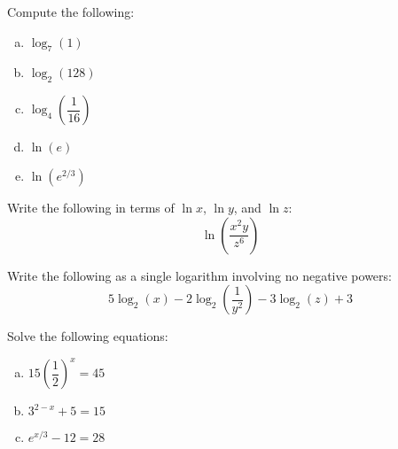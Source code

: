 \documentclass[11pt,letterpaper]{article}
\begin{document}

 Compute the following:
	\begin{enumerate}[(a)]
	\item $\log_7(1)$
	\item $\log_2(128)$
	\item $\log_4 \left( \dfrac{1}{16} \right)$
	\item $\ln(e)$
	\item $\ln(e^{2/3})$
	\end{enumerate}



\newpage



 Write the following in terms of $\ln x$, $\ln y$, and $\ln z$:
	\[
	\ln \left( \dfrac{x^2 y}{z^6} \right)
	\]



\newpage



 Write the following as a single logarithm involving no negative powers:
	\[
	5\log_2(x) - 2\log_2 \left( \dfrac{1}{y^2} \right) - 3\log_2(z) + 3
	\]



\newpage



 Solve the following equations:
	\begin{enumerate}[(a)]
	\item $15 \left( \dfrac{1}{2} \right)^x= 45$
	\item $3^{2 - x} + 5= 15$
	\item $e^{x/3} - 12 = 28$
	\end{enumerate}
\end{document}
